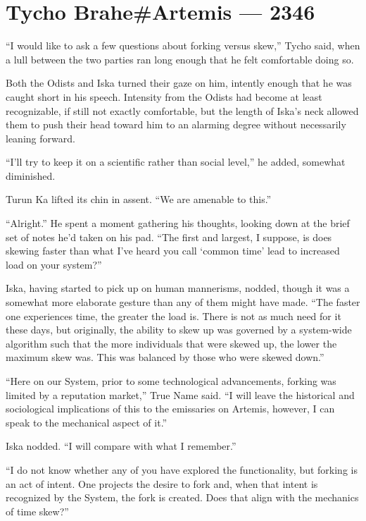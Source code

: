 \hypertarget{tycho-braheartemis-2346}{%
\chapter{Tycho Brahe\#Artemis — 2346}\label{tycho-braheartemis-2346}}

``I would like to ask a few questions about forking versus skew,'' Tycho said, when a lull between the two parties ran long enough that he felt comfortable doing so.

Both the Odists and Iska turned their gaze on him, intently enough that he was caught short in his speech. Intensity from the Odists had become at least recognizable, if still not exactly comfortable, but the length of Iska's neck allowed them to push their head toward him to an alarming degree without necessarily leaning forward.

``I'll try to keep it on a scientific rather than social level,'' he added, somewhat diminished.

Turun Ka lifted its chin in assent. ``We are amenable to this.''

``Alright.'' He spent a moment gathering his thoughts, looking down at the brief set of notes he'd taken on his pad. ``The first and largest, I suppose, is does skewing faster than what I've heard you call `common time' lead to increased load on your system?''

Iska, having started to pick up on human mannerisms, nodded, though it was a somewhat more elaborate gesture than any of them might have made. ``The faster one experiences time, the greater the load is. There is not as much need for it these days, but originally, the ability to skew up was governed by a system-wide algorithm such that the more individuals that were skewed up, the lower the maximum skew was. This was balanced by those who were skewed down.''

``Here on our System, prior to some technological advancements, forking was limited by a reputation market,'' True Name said. ``I will leave the historical and sociological implications of this to the emissaries on Artemis, however, I can speak to the mechanical aspect of it.''

Iska nodded. ``I will compare with what I remember.''

``I do not know whether any of you have explored the functionality, but forking is an act of intent. One projects the desire to fork and, when that intent is recognized by the System, the fork is created. Does that align with the mechanics of time skew?''

